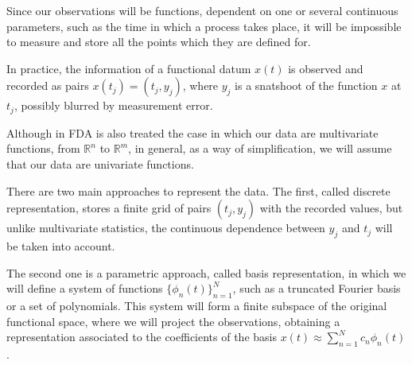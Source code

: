 Since our observations will be functions, dependent on one or several continuous
parameters, such as the time in which a process takes place, it will be
impossible to measure and store all the points which they are defined for.

In practice, the information of a functional datum $x(t)$ is observed and
recorded as pairs $x(t_j) = (t_j, y_j)$, where $y_j$ is a snatshoot of the
function $x$ at $t_j$, possibly blurred by measurement error\cite{Ramsay2005}.

Although in FDA is also treated the case in which our data are multivariate
functions, from  $\mathbb{R}^n$ to $\mathbb{R}^m$, in general, as a way of
simplification, we will assume that our data are univariate functions.

There are two main approaches to represent the data. The first, called discrete
representation, stores a finite grid of pairs $(t_j, y_j)$ with the recorded
values, but unlike multivariate statistics, the continuous dependence between
$y_j$ and $t_j$ will be taken into account.

The second one is a parametric approach, called basis representation, in which
we will define a system of functions $\{\phi_n(t) \}_{n=1}^N$, such as a
truncated Fourier basis or a set of polynomials. This system will form a finite
subspace of the original functional space, where we will project the
observations, obtaining a representation associated to the coefficients of
the basis $x(t) \approx \sum_{n=1}^N c_n\phi_n(t)$.
